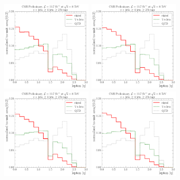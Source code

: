 \begin{figure}[!htbp]
  \centering
    \hspace*{\fill}
    {\includegraphics[width=0.39\textwidth]{measurement/WPT/central/fit_templates/electron_templates_bin_0-40}}\hfill
    {\includegraphics[width=0.39\textwidth]{measurement/WPT/central/fit_templates/electron_templates_bin_40-70}}
    \hspace*{\fill} \\
    \hspace*{\fill}
    {\includegraphics[width=0.39\textwidth]{measurement/WPT/central/fit_templates/electron_templates_bin_70-100}}\hfill
    {\includegraphics[width=0.39\textwidth]{measurement/WPT/central/fit_templates/electron_templates_bin_100-130}}

\end{figure}
